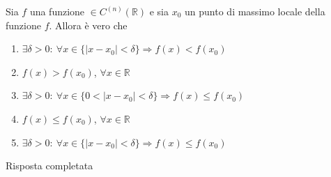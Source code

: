 \begin{quiz}
Sia $f$ una funzione $\in C^{(n)}(\mathbb R)$ e sia $x_0$ un punto di massimo locale della funzione $f$. Allora \`e vero che
\begin{enumerate}
\item $\exists\delta>0:\ \forall x\in\{|x-x_0|<\delta\}\Rightarrow f(x)<f(x_0)$
\item $f(x)>f(x_0)$, $\forall x\in\mathbb R$
\item $\exists\delta>0:\ \forall x\in\{0<|x-x_0|<\delta\}\Rightarrow f(x)\le f(x_0)$
\item $f(x)\le f(x_0)$, $\forall x\in\mathbb R$
\item $\exists\delta>0:\ \forall x\in\{|x-x_0|<\delta\}\Rightarrow f(x)\le f(x_0)$
\end{enumerate}
\end{quiz}
Risposta completata
